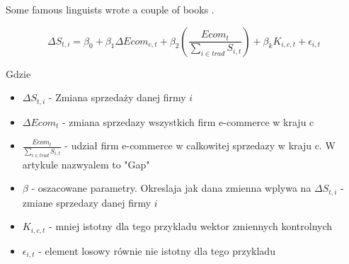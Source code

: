 \documentclass{article}
\begin{document}
Some famous linguists wrote a couple of books \autocite{Labov1972,Chomsky1957}.


$$\Delta S_{t,i} = \beta_0 + \beta_1 \Delta Ecom_{c,t} + \beta_2 \left(\frac{Ecom_t}{\sum_{i \in trad} S_{i,t}}\right) + \beta_k K_{i,c,t} + \epsilon_{i,t}$$

Gdzie

\begin{itemize}
\item $\Delta S_{t,i}$ - Zmiana sprzedaży danej firmy $i$
\item $\Delta Ecom_{t}$ - zmiana sprzedazy wszystkich firm e-commerce w kraju c
\item $\frac{Ecom_t}{\sum_{i \in trad} S_{i,t}}$ - udział firm e-commerce w calkowitej sprzedazy w kraju c. W artykule nazwyalem to "Gap"
\item $\beta$ - oszacowane parametry. Okreslaja jak dana zmienna wplywa na $\Delta S_{t,i}$ - zmiane sprzedazy danej firmy $i$
\item $K_{i,c,t}$ - mniej istotny dla tego przykladu wektor zmiennych kontrolnych
\item $\epsilon_{i,t}$ - element losowy równie nie istotny dla tego przykladu
\end{itemize}

\printbibliography
\end{document}
